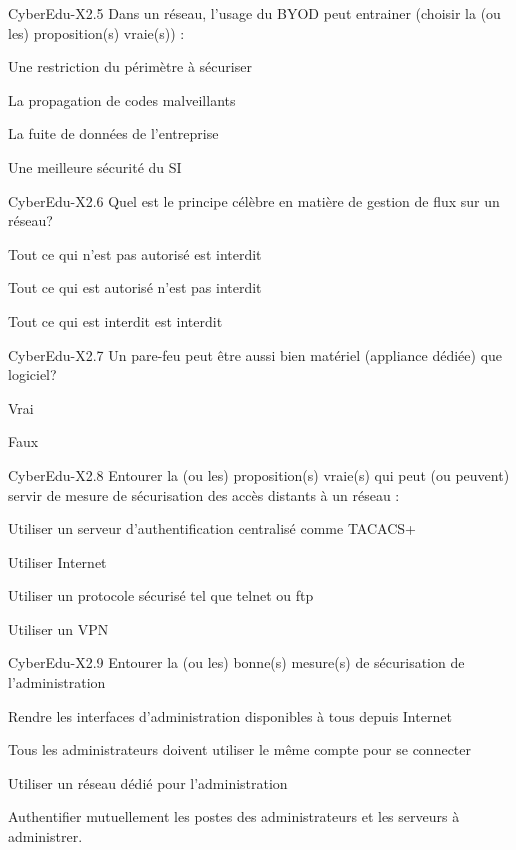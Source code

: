 \begin{multi}[multiple=true]{CyberEdu-X2.5}
	Dans un réseau, l'usage du BYOD peut entrainer (choisir la (ou les) proposition(s) vraie(s)) :
\item Une restriction du périmètre à sécuriser
\item* La propagation de codes malveillants
\item* La fuite de données de l'entreprise
\item Une meilleure sécurité du SI
\end{multi}

\begin{multi}[multiple=true]{CyberEdu-X2.6}
	Quel est le principe célèbre en matière de gestion de flux sur un réseau?
\item* Tout ce qui n'est pas autorisé est interdit
\item Tout ce qui est autorisé n'est pas interdit
\item Tout ce qui est interdit est interdit
\end{multi}

\begin{multi}[multiple=true]{CyberEdu-X2.7}
	Un  pare-feu  peut être aussi bien matériel (appliance dédiée) que logiciel?
\item* Vrai
\item Faux
\end{multi}

\begin{multi}[multiple=true]{CyberEdu-X2.8}
	Entourer la (ou les) proposition(s) vraie(s) qui peut (ou peuvent) servir de mesure de sécurisation des accès distants à un réseau :
\item* Utiliser un serveur d'authentification centralisé comme TACACS+
\item Utiliser Internet
\item Utiliser un protocole sécurisé tel que telnet ou ftp
\item* Utiliser un VPN
\end{multi}

\begin{multi}[multiple=true]{CyberEdu-X2.9}
	Entourer la (ou les) bonne(s) mesure(s) de sécurisation de l'administration
\item Rendre les interfaces d'administration disponibles à tous depuis Internet
\item Tous les administrateurs doivent utiliser le même compte pour se connecter
\item* Utiliser un réseau dédié pour l'administration
\item* Authentifier mutuellement les postes des administrateurs et les serveurs à administrer.
\end{multi}

